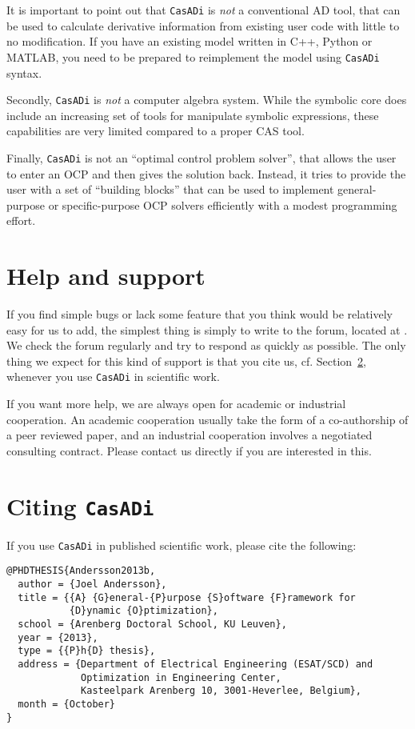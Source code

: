 \documentclass[a4paper,12pt]{book}
\newcommand{\CasADi}{\texttt{CasADi}\xspace}
\begin{document}
It is important to point out that \CasADi is \emph{not} a conventional AD tool, that can be used to calculate derivative information from existing user code with little to no modification. If you have an existing model written in C++, Python or MATLAB, you need to be prepared to reimplement the model using \CasADi syntax.

Secondly, \CasADi is \emph{not} a computer algebra system. While the symbolic core does include an increasing set of tools for manipulate symbolic expressions, these capabilities are very limited compared to a proper CAS tool.

Finally, \CasADi is not an ``optimal control problem solver'', that allows the user to enter an OCP and then gives the solution back. Instead, it tries to provide the user with a set of ``building blocks'' that can be used to implement general-purpose or specific-purpose OCP solvers efficiently with a modest programming effort.

\section{Help and support} \label{sec:support}
If you find simple bugs or lack some feature that you think would be relatively easy for us to add, the simplest thing is simply to write to the forum, located at . We check the forum regularly and try to respond as quickly as possible. The only thing we expect for this kind of support is that you cite us, cf. Section~\ref{sec:citing}, whenever you use \CasADi in scientific work.

If you want more help, we are always open for academic or industrial cooperation. An academic cooperation usually take the form of a co-authorship of a peer reviewed paper, and an industrial cooperation involves a negotiated consulting contract. Please contact us directly if you are interested in this.

\section{Citing \CasADi} \label{sec:citing}
If you use \CasADi in published scientific work, please cite the following:
\begin{verbatim}
@PHDTHESIS{Andersson2013b,
  author = {Joel Andersson},
  title = {{A} {G}eneral-{P}urpose {S}oftware {F}ramework for
           {D}ynamic {O}ptimization},
  school = {Arenberg Doctoral School, KU Leuven},
  year = {2013},
  type = {{P}h{D} thesis},
  address = {Department of Electrical Engineering (ESAT/SCD) and
             Optimization in Engineering Center,
             Kasteelpark Arenberg 10, 3001-Heverlee, Belgium},
  month = {October}
}
\end{verbatim}
\end{document}

